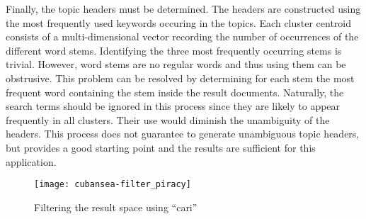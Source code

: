 Finally, the topic headers must be determined. The headers are constructed using the most frequently used keywords occuring in the topics. Each cluster centroid consists of a multi-dimensional vector recording the number of occurrences of the different word stems. Identifying the three most frequently occurring stems is trivial. However, word stems are no regular words and thus using them can be obstrusive. This problem can be resolved by determining for each stem the most frequent word containing the stem inside the result documents. Naturally, the search terms should be ignored in this process since they are likely to appear frequently in all clusters. Their use would diminish the unambiguity of the headers. This process does not guarantee to generate unambiguous topic headers, but provides a good starting point and the results are sufficient for this application.

\begin{figure*}[!t]
	\centering
	\texttt{[image: cubansea-filter\_piracy]}
	\caption{Filtering the result space using ``cari''}
	\label{fig:filter:piracy:cari}
\end{figure*}
